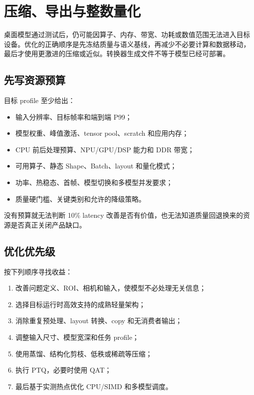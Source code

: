 \chapter{压缩、导出与整数量化}
\label{chap:edge-ai-optimization-export-quantization}

桌面模型通过测试后，仍可能因算子、内存、带宽、功耗或数值范围无法进入目标设备。优化的正确顺序是先冻结质量与语义基线，再减少不必要计算和数据移动，最后才使用更激进的压缩或近似。转换器生成文件不等于模型已经可部署。

\section{先写资源预算}

目标 profile 至少给出：

\begin{itemize}
  \item 输入分辨率、目标帧率和端到端 P99；
  \item 模型权重、峰值激活、tensor pool、scratch 和应用内存；
  \item CPU 前后处理预算、NPU/GPU/DSP 能力和 DDR 带宽；
  \item 可用算子、静态 Shape、Batch、layout 和量化模式；
  \item 功率、热稳态、首帧、模型切换和多模型并发要求；
  \item 质量硬门槛、关键类别和允许的降级策略。
\end{itemize}

没有预算就无法判断 10\% latency 改善是否有价值，也无法知道质量回退换来的资源是否真正关闭产品缺口。

\section{优化优先级}

按下列顺序寻找收益：

\begin{enumerate}
  \item 改善问题定义、ROI、相机和输入，使模型不必处理无关信息；
  \item 选择目标运行时高效支持的成熟轻量架构；
  \item 消除重复预处理、layout 转换、copy 和无消费者输出；
  \item 调整输入尺寸、模型宽深和任务 profile；
  \item 使用蒸馏、结构化剪枝、低秩或稀疏等压缩；
  \item 执行 PTQ，必要时使用 QAT；
  \item 最后基于实测热点优化 CPU/SIMD 和多模型调度。
\end{enumerate}

